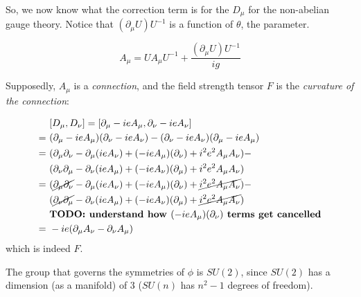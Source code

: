 So, we now know what the correction term is for the $D_\mu$ for the
non-abelian gauge theory. Notice that $(\partial_\mu U) U^{-1}$ is a function
of $\theta$, the parameter.

\begin{equation}
    \boxed{A_\mu  =   U A_\mu U^{-1} + \frac{(\partial_\mu U) U^{-1}}{i g}}
\end{equation}

Supposedly, $A_\mu$ is a \textit{connection}, and the field strength tensor
$F$ is the \textit{curvature of the connection}:

\begin{align*}
    &[D_\mu, D_\nu] = [\partial_\mu - i e A_\mu, \partial_\nu - i e A_\nu] \\
    =~&(\partial_\mu - i e A_\mu)(\partial_\nu - i e A_\nu) -  
    (\partial_\nu - i e A_\nu) (\partial_\mu - i e A_\mu) \\
    =~ %
    &(\partial_\mu \partial_\nu - \partial_\mu (i e A_\nu) +
    (- i e A_\mu) (\partial_\nu) + i^2 e^2 A_\mu A_\nu) - \\
    &(\partial_\nu \partial_\mu - \partial_\nu (i e A_\mu) +
    (- i e A_\nu)(\partial_\mu) + i^2 e^2 A_\mu A_\nu) \\
    =~ %
    &(\cancel{\partial_\mu \partial_\nu} - \partial_\mu (i e A_\nu) +
    (- i e A_\mu) (\partial_\nu) + \cancel{i^2 e^2 A_\mu A_\nu}) - \\
    &(\cancel{\partial_\nu \partial_\mu} - \partial_\nu (i e A_\mu) +
    (- i e A_\nu)(\partial_\mu) + \cancel{i^2 e^2 A_\mu A_\nu}) \\
    &\textbf{TODO: understand how $(- i e A_\mu) (\partial_\nu)$ terms get cancelled} \\
    =~&- i e (\partial_\mu A_\nu - \partial_\nu A_\mu)
\end{align*}
which is indeed $F$.

The group that governs the symmetries of $\phi$ is $SU(2)$, since $SU(2)$ has
a dimension (as a manifold) of $3$ ($SU(n)$ has $n^2 - 1$ degrees of freedom).
